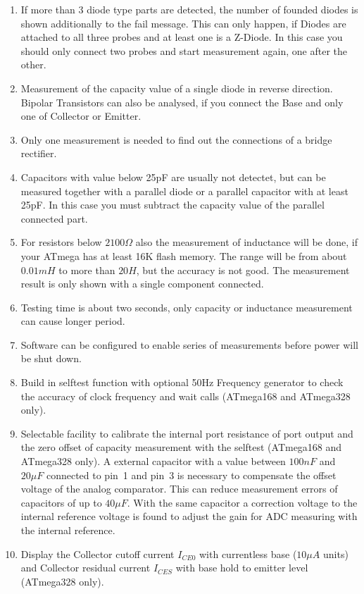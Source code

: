 \begin{enumerate}
\begin{enumerate}
\item If more than 3 diode type parts are detected, the number of founded diodes is shown additionally to the fail message.
 This can only happen, if Diodes are attached to all three probes and at least one is a Z-Diode.
In this case you should only connect two probes and start measurement again, one after the other.
\item Measurement of the capacity value of a single diode in reverse direction.
Bipolar Transistors can also be analysed, if you connect the Base and only one of Collector or Emitter.
\item Only one measurement is needed to find out the connections of a bridge rectifier.
\item Capacitors with value below 25pF are usually not detectet, but can be measured together with
a parallel diode or a parallel capacitor with at least 25pF.
In this case you must subtract the capacity value of the parallel connected part.
\item For resistors below \(2100 \Omega\) also the measurement of inductance will be done, if
your ATmega has at least 16K flash memory.
The range will be from about \(0.01 mH\) to more than \(20 H\), but the accuracy is not good.
The measurement result is only shown with a single component connected.
\item Testing time is about two seconds, only capacity or inductance measurement can cause longer period.
\item Software can be configured to enable series of measurements before power will be shut down.
\item Build in selftest function with optional 50Hz Frequency generator to check the accuracy of clock frequency and wait calls (ATmega168 and ATmega328 only).
\item Selectable facility to calibrate the internal port resistance of port output and
the zero offset of capacity measurement with the selftest (ATmega168 and ATmega328 only).
A external capacitor with a value between \(100 nF\) 
and \(20 \mu F\) connected to pin~1 and pin~3 is necessary to compensate the offset voltage of the analog comparator.
This can reduce measurement errors of capacitors of up to \(40 \mu F\).
With the same capacitor a correction voltage to the internal reference voltage is found to adjust the
gain for ADC measuring with the internal reference.
\item Display the Collector cutoff current \(I_{CE0}\) with currentless base (\(10\mu A\) units) and
Collector residual current \(I_{CES}\) with base hold to emitter level (ATmega328 only).

\end{enumerate}
\end{enumerate}
